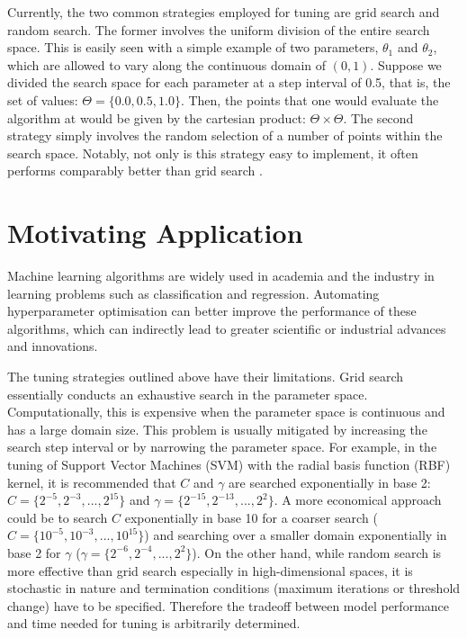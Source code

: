 \documentclass[letterpaper]{article}
\begin{document}
Currently, the two common strategies employed for tuning are grid search and
random search. The former involves the uniform division of the entire search
space. This is easily seen with a simple example of two parameters, $\theta_1$ and
$\theta_2$, which are allowed to vary along the continuous domain of $(0, 1)$.
Suppose we divided the search space for each parameter at a step interval of 0.5,
that is, the set of values: $\Theta=\{0.0, 0.5, 1.0\}$. Then, the points that one
would evaluate the algorithm at would be given by the cartesian product: $\Theta \times \Theta$.
The second strategy simply involves the random selection of a number of points
within the search space. Notably, not only is this strategy easy to implement, it
often performs comparably better than grid search \cite{bergstra2012random}.

\section{Motivating Application}
Machine learning algorithms are widely used in academia and the industry in learning
problems such as classification and regression. Automating hyperparameter optimisation
can better improve the performance of these algorithms, which can indirectly lead
to greater scientific or industrial advances and innovations.

The tuning strategies outlined above have their limitations. Grid search essentially
conducts an exhaustive search in the parameter space. Computationally, this is expensive
when the parameter space is continuous and has a large domain size. This problem
is usually mitigated by increasing the search step interval
or by narrowing the parameter space. For example, in the tuning of Support Vector Machines
(SVM) with the radial basis function (RBF) kernel, it is recommended that $\textit{C}$ and $\gamma$ are searched
exponentially in base 2: $\textit{C}=\{2^{-5},2^{-3},...,2^{15}\}$ and
$\gamma=\{2^{-15},2^{-13},...,2^{2}\}$. A more economical approach could be to search
$\textit{C}$ exponentially in base 10 for a coarser search
($\textit{C}=\{10^{-5},10^{-3},...,10^{15}\}$) and searching over a smaller domain
exponentially in base 2 for $\gamma$ ($\gamma=\{2^{-6},2^{-4},...,2^{2}\}$). On the other hand, while random
search is more effective than grid search especially in high-dimensional spaces,
it is stochastic in nature and termination conditions (maximum iterations or threshold change)
have to be specified. Therefore the tradeoff between model performance and time needed
for tuning is arbitrarily determined.
\end{document}
